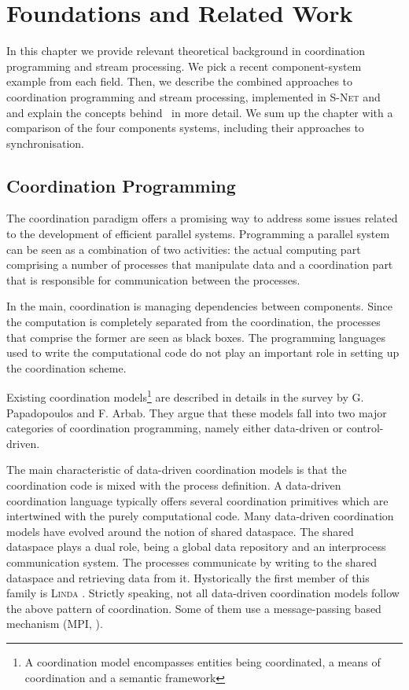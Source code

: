 \chapter{Foundations and Related Work}\label{chap_found}
In this chapter we provide relevant theoretical background in coordination programming and stream processing. We pick a recent component-system example from each field. Then, we describe the combined approaches to coordination programming and stream processing, implemented in \textsc{S-Net} and \ak\, and explain the concepts behind \ak\ in more detail. We sum up the chapter with a comparison of the four components systems, including their approaches to synchronisation.


    \section{Coordination Programming}
The coordination paradigm offers a promising way to address some issues related to the development of efficient parallel systems. Programming a parallel system can be seen as a combination of two activities: the actual computing part comprising a number of processes that manipulate data and a coordination part that is responsible for communication between the processes.

In the main, coordination is managing dependencies between components. Since the computation is completely separated from the coordination, the processes that comprise the former are seen as black boxes. The programming languages used to write the computational code do not play an important role in setting up the coordination scheme.

Existing coordination models\footnote{A coordination model encompasses entities being coordinated, a means of coordination and a semantic framework} are described in details in the survey \cite{papadopoulos} by G. Papadopoulos and F. Arbab. They argue that these models fall into two major categories of coordination programming, namely either data-driven or control-driven.

The main characteristic of data-driven coordination models is that the coordination code is mixed with the process definition. A data-driven coordination language typically offers several coordination primitives which are intertwined with the purely computational code. Many data-driven coordination models have evolved around the notion of shared dataspace. The shared dataspace plays a dual role, being a global data repository and an interprocess communication system. The processes communicate by writing to the shared dataspace and retrieving data from it. Hystorically the first member of this family is \textsc{Linda} \cite{linda}. Strictly speaking, not all data-driven coordination models follow the above pattern of coordination. Some of them use a message-passing based mechanism (\textsc{MPI}, \cite{mpi}).

